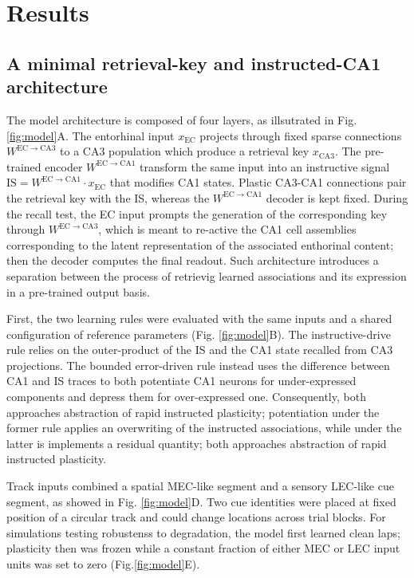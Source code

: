 \section{Results}

\subsection{A minimal retrieval-key and instructed-CA1 architecture}

The model architecture is composed of four layers, as illsutrated in Fig. \ref{fig:model}A.
The entorhinal input $x_{\mathrm{EC}}$ projects through fixed sparse connections $W^{\mathrm{EC}\to\mathrm{CA3}}$ to a CA3 population which produce a retrieval key $x_{\mathrm{CA3}}$.
The pre-trained encoder $W^{\mathrm{EC}\to\mathrm{CA1}}$ transform the same input into an instructive signal $\mathrm{IS}=W^{\mathrm{EC}\to\mathrm{CA1}}\cdot x_{\mathrm{EC}}$ that modifies CA1 states.
Plastic CA3-CA1 connections pair the retrieval key with the IS, whereas the $W^{\mathrm{EC}\to\mathrm{CA1}}$ decoder is kept fixed.
During the recall test, the EC input prompts the generation of the corresponding key through $W^{\mathrm{EC}\to\mathrm{CA3}}$, which is meant to re-active the CA1 cell assemblies corresponding to the latent representation of the associated enthorinal content; then the decoder computes the final readout.
Such architecture introduces a separation between the process of retrievig learned associations and its expression in a pre-trained output basis.

First, the two learning rules were evaluated with the same inputs and a shared configuration of reference parameters (Fig. \ref{fig:model}B).
The instructive-drive rule relies on the outer-product of the IS and the CA1 state recalled from CA3 projections.
The bounded error-driven rule instead uses the difference between CA1 and IS traces to both potentiate CA1 neurons for under-expressed components and depress them for over-expressed one.
Consequently, both approaches abstraction of rapid instructed plasticity; potentiation under the former rule applies an overwriting of the instructed associations, while under the latter is implements a residual quantity; both approaches abstraction of rapid instructed plasticity.

Track inputs combined a spatial MEC-like segment and a sensory LEC-like cue segment, as showed in Fig. \ref{fig:model}D.
Two cue identities were placed at fixed position of a circular track and could change locations across trial blocks.
For simulations testing robustenss to degradation, the model first learned clean laps; plasticity then was frozen while a constant fraction of either MEC or LEC input units was set to zero (Fig.\ref{fig:model}E).


